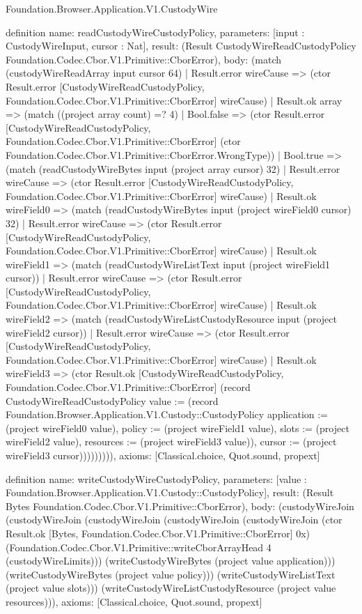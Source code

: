 \begin{lexlean}{Foundation.Browser.Application.V1.CustodyWire}
\begin{semanticmodule}
definition{
  name: readCustodyWireCustodyPolicy,
  parameters: [input : CustodyWireInput, cursor : Nat],
  result: (Result CustodyWireReadCustodyPolicy Foundation.Codec.Cbor.V1.Primitive::CborError),
  body: (match (custodyWireReadArray input cursor 64)
    | Result.error wireCause => (ctor Result.error [CustodyWireReadCustodyPolicy, Foundation.Codec.Cbor.V1.Primitive::CborError] wireCause)
    | Result.ok array => (match ((project array count) =? 4)
      | Bool.false => (ctor Result.error [CustodyWireReadCustodyPolicy, Foundation.Codec.Cbor.V1.Primitive::CborError] (ctor Foundation.Codec.Cbor.V1.Primitive::CborError.WrongType))
      | Bool.true => (match (readCustodyWireBytes input (project array cursor) 32)
        | Result.error wireCause => (ctor Result.error [CustodyWireReadCustodyPolicy, Foundation.Codec.Cbor.V1.Primitive::CborError] wireCause)
        | Result.ok wireField0 => (match (readCustodyWireBytes input (project wireField0 cursor) 32)
          | Result.error wireCause => (ctor Result.error [CustodyWireReadCustodyPolicy, Foundation.Codec.Cbor.V1.Primitive::CborError] wireCause)
          | Result.ok wireField1 => (match (readCustodyWireListText input (project wireField1 cursor))
            | Result.error wireCause => (ctor Result.error [CustodyWireReadCustodyPolicy, Foundation.Codec.Cbor.V1.Primitive::CborError] wireCause)
            | Result.ok wireField2 => (match (readCustodyWireListCustodyResource input (project wireField2 cursor))
              | Result.error wireCause => (ctor Result.error [CustodyWireReadCustodyPolicy, Foundation.Codec.Cbor.V1.Primitive::CborError] wireCause)
              | Result.ok wireField3 => (ctor Result.ok [CustodyWireReadCustodyPolicy, Foundation.Codec.Cbor.V1.Primitive::CborError] (record CustodyWireReadCustodyPolicy {value := (record Foundation.Browser.Application.V1.Custody::CustodyPolicy {application := (project wireField0 value), policy := (project wireField1 value), slots := (project wireField2 value), resources := (project wireField3 value)}), cursor := (project wireField3 cursor)})))))))),
  axioms: [Classical.choice, Quot.sound, propext]
}

definition{
  name: writeCustodyWireCustodyPolicy,
  parameters: [value : Foundation.Browser.Application.V1.Custody::CustodyPolicy],
  result: (Result Bytes Foundation.Codec.Cbor.V1.Primitive::CborError),
  body: (custodyWireJoin (custodyWireJoin (custodyWireJoin (custodyWireJoin (custodyWireJoin (ctor Result.ok [Bytes, Foundation.Codec.Cbor.V1.Primitive::CborError] 0x) (Foundation.Codec.Cbor.V1.Primitive::writeCborArrayHead 4 (custodyWireLimits))) (writeCustodyWireBytes (project value application))) (writeCustodyWireBytes (project value policy))) (writeCustodyWireListText (project value slots))) (writeCustodyWireListCustodyResource (project value resources))),
  axioms: [Classical.choice, Quot.sound, propext]
}


\end{semanticmodule}
\end{lexlean}
